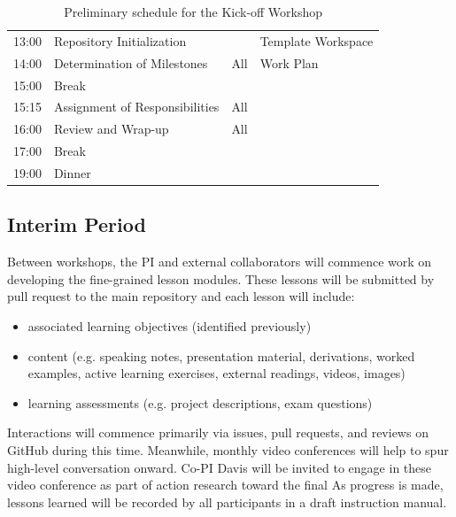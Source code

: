 \documentclass[11pt]{article}
\begin{document}
\begin{table}[h!]
\begin{tabularx}{\textwidth}{r|l|l|X}
13:00& Repository Initialization&&  Template Workspace\\
14:00& Determination of Milestones& All& Work Plan\\
15:00& Break&&  \\
15:15& Assignment of Responsibilities& All&  \\
16:00& Review and Wrap-up& All&  \\
17:00& Break&&  \\
19:00& Dinner&&  \\
\hline
                  \end{tabularx}
                  \caption{Preliminary schedule for the Kick-off Workshop}
                  \label{tab:kickoff}
          \end{table}


          \subsection{Interim Period}
          Between workshops, the PI and external collaborators will commence 
          work on developing 
          the fine-grained lesson modules. These lessons will be submitted by pull request to the main 
          repository and each lesson will include:
          \begin{itemize} 
                \item associated learning objectives (identified previously)
                \item content (e.g. speaking notes, presentation material, 
                      derivations, worked examples, active learning  
                      exercises, external readings, videos, images)
                \item learning assessments (e.g. project descriptions, exam questions) 
          \end{itemize} 

          Interactions will commence primarily via issues, pull requests, and 
          reviews on GitHub during this time. Meanwhile, monthly video 
          conferences will help to spur high-level conversation onward.
          Co-PI Davis will be invited to engage in these video conference as 
          part of action research toward the final 
          As progress is made, lessons learned will be recorded by all 
          participants in a draft instruction manual.
\end{document}
